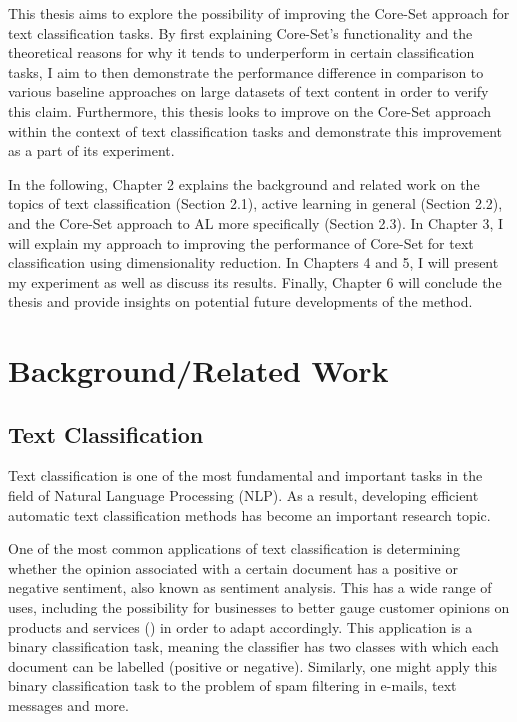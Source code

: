 \documentclass[english,bachelor,lu]{webisthesis} %
\begin{document}
This thesis aims to explore the possibility of improving the Core-Set approach for text classification tasks. By first explaining Core-Set's functionality and the theoretical reasons for why it tends to underperform in certain classification tasks, I aim to then demonstrate the performance difference in comparison to various baseline approaches on large datasets of text content in order to verify this claim. Furthermore, this thesis looks to improve on the Core-Set approach within the context of text classification tasks and demonstrate this improvement as a part of its experiment.

In the following, Chapter 2 explains the background and related work on the topics of text classification (Section 2.1), active learning in general (Section 2.2), and the Core-Set approach to AL more specifically (Section 2.3). In Chapter 3, I will explain my approach to improving the performance of Core-Set for text classification using dimensionality reduction. In Chapters 4 and 5, I will present my experiment as well as discuss its results. Finally, Chapter 6 will conclude the thesis and provide insights on potential future developments of the method. 

\chapter{Background/Related Work}

\section{Text Classification}

Text classification is one of the most fundamental and important tasks in the field of Natural Language Processing (NLP). As a result, developing efficient automatic text classification methods has become an important research topic. 

One of the most common applications of text classification is determining whether the opinion associated with a certain document has a positive or negative sentiment, also known as sentiment analysis. This has a wide range of uses, including the possibility for businesses to better gauge customer opinions on products and services (\cite{DBLP:books/sp/mining2012/LiuZ12}) in order to adapt accordingly. This application is a binary classification task, meaning the classifier has two classes with which each document can be labelled (positive or negative). Similarly, one might apply this binary classification task to the problem of spam filtering in e-mails, text messages and more. 
\end{document}
